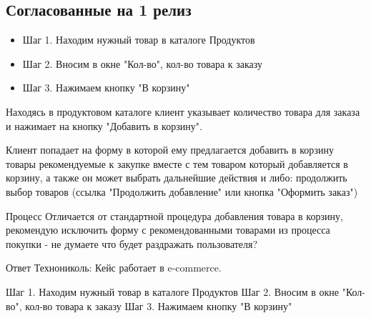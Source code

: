 \subsection{Согласованные на 1 релиз}
\fi
{}
{


\begin{wiki}
\begin{itemize}
\item Шаг 1. Находим нужный товар в каталоге Продуктов
\item Шаг 2. Вносим в окне "Кол-во", кол-во товара к заказу
\item Шаг 3. Нажимаем кнопку "В корзину"
\end{itemize}

Находясь в продуктовом каталоге клиент указывает количество товара для заказа и нажимает на кнопку "Добавить в корзину". 

Клиент попадает на форму в которой ему предлагается добавить в корзину товары рекомендуемые к закупке вместе с тем товаром который добавляется в корзину, а также он может выбрать дальнейшие действия и либо: продолжить выбор товаров (ссылка "Продолжить добавление" или кнопка "Оформить заказ")
\end{wiki}

\begin{hybris}
Процесс Отличается от стандартной процедура добавления товара в корзину, рекомендую исключить форму с рекомендованными товарами из процесса покупки - не думаете что будет раздражать пользователя?

Ответ Технониколь: Кейс работает в e-commerce.
\end{hybris}


\begin{itogo}
Шаг 1. Находим нужный товар в каталоге Продуктов
Шаг 2. Вносим в окне "Кол-во", кол-во товара к заказу
Шаг 3. Нажимаем кнопку "В корзину"
\end{itogo}


}

